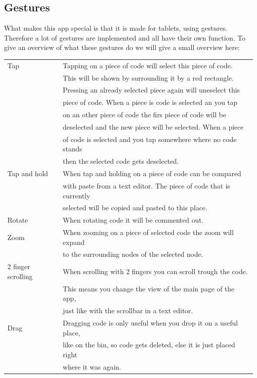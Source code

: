 \documentclass[a4paper,12pt]{report}
\begin{document}
\subsection{Gestures}
What makes this app special is that it is made for tablets, using gestures. Therefore a lot of gestures are implemented and all have their own function. To give an overview of what these gestures do we will give 
a small overview here:

\begin{tabular}{ l | l}
Tap & Tapping on a piece of code will select this piece of code. \\
& This will be shown by surrounding it by a red rectangle.\\
& Pressing an already selected piece again will uneselect this \\
& piece of code. When a piece is code is selected an you tap \\
& on an other piece of code the firs piece of code will be \\
& deselected and the new piece will be selected. When a piece \\
& of code is selected and you tap somewhere where no code stands \\
& then the selected code gets deselected. \\
Tap and hold & When tap and holding on a piece of code can be compared \\
& with paste from a text editor. The piece of code that is currently \\
& selected will be copied and pasted to this place.\\
Rotate & When rotating code it will be commented out. \\
Zoom & When zooming on a piece of selected code the zoom will expand \\
& to the surrounding nodes of the selected node. \\
2 finger scrolling & When scrolling with 2 fingers you can scroll trough the code. \\
& This means you change the view of the main page of the app, \\
& just like with the scrollbar in a text editor.\\
Drag & Dragging code is only useful when you drop it on a useful place,\\
& like on the bin, so code gets deleted, else it is just placed right \\
& where it was again.\\
 \end{tabular}
\end{document}
